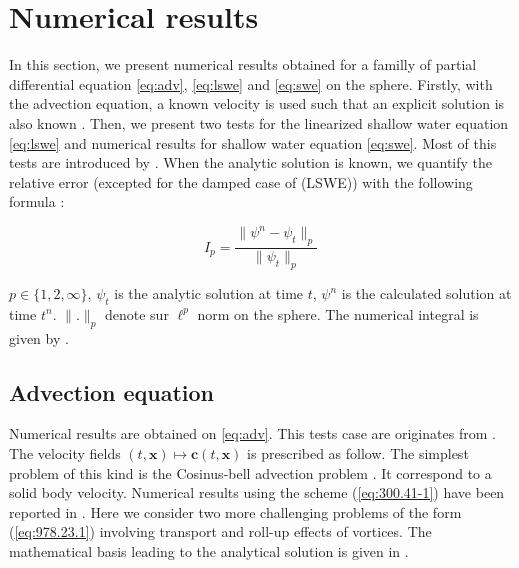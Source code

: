 
\section{Numerical results}

In this section, we present numerical results obtained for a familly of partial differential equation \eqref{eq:adv}, \eqref{eq:lswe} and \eqref{eq:swe} on the sphere. Firstly, with the advection equation, a known velocity is used such that an explicit solution is also known \cite{Nair-Machenhauer, Nair-Jablonowski}. Then, we present two tests for the linearized shallow water equation \eqref{eq:lswe} and numerical results for shallow water equation \eqref{eq:swe}. Most of this tests are introduced by \cite{Williamson-Drake-Hack-Jakob-Swarztrauber, Galewsky-Scott-Polvani}.
When the analytic solution is known, we quantify the relative error (excepted for the damped case of (LSWE)) with the following formula :

\begin{equation}
\label{eq:error1}
I_p = \dfrac{\|\psi^n - \psi_t \|_p}{\| \psi_t \|_p}
\end{equation}

$p \in \lbrace 1, 2, \infty \rbrace$, $\psi_t$ is the analytic solution at time $t$, $\psi^n$ is the calculated solution at time $t^n$. 
$ \| . \| _p$ denote sur $\ell^p$ norm on the sphere. The numerical integral is given by \cite{Croisille-12}.

\subsection{Advection equation}

Numerical results are obtained on \eqref{eq:adv}. This tests case are originates from \cite{Nair-Machenhauer, Nair-Jablonowski}. The velocity fields $(t,\mathbf{x}) \mapsto \mathbf{c} ( t,\mathbf{x})$ is prescribed as follow. The simplest problem of this kind is the Cosinus-bell advection problem \cite{Williamson-Drake-Hack-Jakob-Swarztrauber, Galewsky-Scott-Polvani}. It correspond to a solid body velocity. Numerical results using the scheme (\ref{eq:300.41-1}) have been reported in  \cite{Croisille-10}. 
Here we consider two more challenging problems of the form (\ref{eq:978.23.1}) involving transport and roll-up effects of vortices. 
The mathematical basis leading to the analytical solution is given in \cite{Nair-Cote-Stanisforth}.

